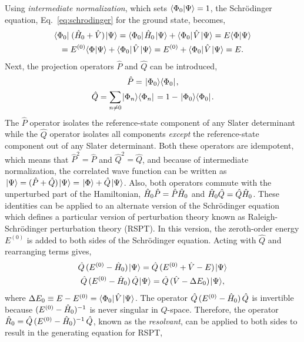 \documentclass[thesis.tex]{subfiles}
\begin{document}
Using \textit{intermediate normalization}, which sets $\langle \Phi_{0} | \Psi\rangle = 1$, the Schr\"{o}dinger equation, Eq.\ \eqref{eq:schrodinger} for the ground state, becomes,
\begin{gather}
  \langle \Phi_{0} |\hspace{1pt}\mathop{(\hat{H}\hspace{-1pt}_{0} + \hat{V})}\hspace{1pt}\lvert \Psi \rangle = \langle \Phi_{0} |\hspace{1pt}\hat{H}\hspace{-1pt}_{0}\hspace{1pt}\lvert \Psi \rangle + \langle \Phi_{0} |\hspace{1pt}\hat{V}\hspace{1pt}\lvert \Psi \rangle = E\langle \Phi | \Psi\rangle \notag \\
  = E^{(0)}\langle \Phi | \Psi\rangle + \langle \Phi_{0} |\hspace{1pt}\hat{V}\hspace{1pt}\lvert \Psi \rangle = E^{(0)} + \langle \Phi_{0} |\hspace{1pt}\hat{V}\hspace{1pt}\lvert \Psi \rangle = E. \label{eq:mbpt_schrodinger}
\end{gather}
Next, the projection operators $\hat{P}$ and $\hat{Q}$ can be introduced,
\begin{gather}
  \hat{P} = \hspace{1pt}\lvert \Phi_{0} \rangle\langle \Phi_{0} |\hspace{1pt}, \\
  \hat{Q} = \sum_{n\neq 0}\hspace{1pt}\lvert \Phi_{n} \rangle\langle \Phi_{n} |\hspace{1pt} = 1 - \hspace{1pt}\lvert \Phi_{0} \rangle\langle \Phi_{0} |\hspace{1pt}.
\end{gather}
The $\hat{P}$ operator isolates the reference-state component of any Slater determinant while the $\hat{Q}$ operator isolates all components \textit{except} the reference-state component out of any Slater determinant.  Both these operators are idempotent, which means that $\hat{P}^{2} = \hat{P}$ and $\hat{Q}^{2} = \hat{Q}$, and because of intermediate normalization, the correlated wave function can be written as $\hspace{1pt}\lvert \Psi \rangle = \mathop{(\hat{P} + \hat{Q})}\hspace{1pt}\lvert \Psi \rangle = \hspace{1pt}\lvert \Phi \rangle + \hat{Q}\hspace{1pt}\lvert \Psi \rangle$.  Also, both operators commute with the unperturbed part of the Hamiltonian, $\hat{H}\hspace{-1pt}_{0}\hat{P} = \hat{P}\hat{H}\hspace{-1pt}_{0}$ and $\hat{H}\hspace{-1pt}_{0}\hat{Q} = \hat{Q}\hat{H}\hspace{-1pt}_{0}$.  These identities can be applied to an alternate version of the Schr\"{o}dinger equation which defines a particular version of perturbation theory known as Raleigh-Schr\"{o}dinger perturbation theory (RSPT). In this version, the zeroth-order energy $E^{(0)}$ is added to both sides of the Schr\"{o}dinger equation.  Acting with $\hat{Q}$ and rearranging terms gives,
\begin{gather}
  \hat{Q}\mathop{(E^{(0)} - \hat{H}\hspace{-1pt}_{0})}\hspace{1pt}\lvert \Psi \rangle = \hat{Q}\mathop{(E^{(0)} + \hat{V} - E)}\hspace{1pt}\lvert \Psi \rangle \notag \\
  \hat{Q}\mathop{(E^{(0)} - \hat{H}\hspace{-1pt}_{0})}\hat{Q}\hspace{1pt}\lvert \Psi \rangle = \hat{Q}\mathop{(\hat{V} - \Delta E_{0})}\hspace{1pt}\lvert \Psi \rangle,
\end{gather}
where $\Delta E_{0} \equiv E - E^{(0)} = \langle \Phi_{0} |\hspace{1pt}\hat{V}\hspace{1pt}\lvert \Psi \rangle$.  The operator $\hat{Q}\mathop{(E^{(0)} - \hat{H}\hspace{-1pt}_{0})}\hat{Q}$ is invertible because $\mathop{(E^{(0)} - \hat{H}\hspace{-1pt}_{0})^{-1}}$ is never singular in $Q$-space.  Therefore, the operator $\hat{R}_{0} = \hat{Q}\mathop{(E^{(0)} - \hat{H}\hspace{-1pt}_{0})^{-1}}\hat{Q}$, known as the \textit{resolvant}, can be applied to both sides to result in the generating equation for RSPT,
\end{document}
